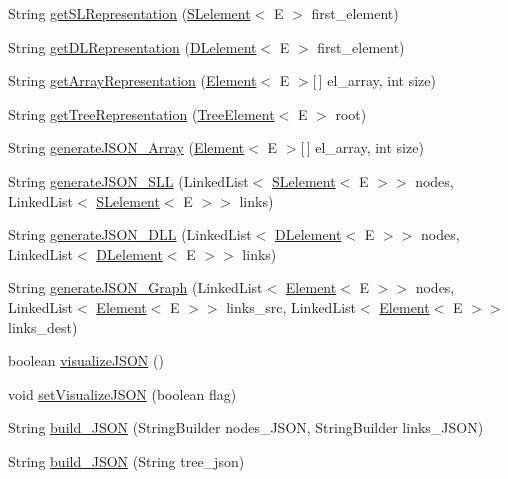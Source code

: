 \begin{DoxyCompactItemize}
String \hyperlink{classbridges_1_1base_1_1_a_d_t_visualizer_a8bfd44ca6eef7b19feb6061cb7e141ef}{get\+S\+L\+Representation} (\hyperlink{classbridges_1_1base_1_1_s_lelement}{S\+Lelement}$<$ E $>$ first\+\_\+element)
\item 
String \hyperlink{classbridges_1_1base_1_1_a_d_t_visualizer_a43eeb9f3321477f58edc3aff52631f3b}{get\+D\+L\+Representation} (\hyperlink{classbridges_1_1base_1_1_d_lelement}{D\+Lelement}$<$ E $>$ first\+\_\+element)
\item 
String \hyperlink{classbridges_1_1base_1_1_a_d_t_visualizer_ad44bb58d6f9c630cc6bbcae175003243}{get\+Array\+Representation} (\hyperlink{classbridges_1_1base_1_1_element}{Element}$<$ E $>$\mbox{[}$\,$\mbox{]} el\+\_\+array, int size)
\item 
String \hyperlink{classbridges_1_1base_1_1_a_d_t_visualizer_ae01d3d38d5c7c3ac239e86d6be46a50a}{get\+Tree\+Representation} (\hyperlink{classbridges_1_1base_1_1_tree_element}{Tree\+Element}$<$ E $>$ root)
\item 
String \hyperlink{classbridges_1_1base_1_1_a_d_t_visualizer_a309d4f0521b66bb1329c0362f1ca5d33}{generate\+J\+S\+O\+N\+\_\+\+Array} (\hyperlink{classbridges_1_1base_1_1_element}{Element}$<$ E $>$\mbox{[}$\,$\mbox{]} el\+\_\+array, int size)
\item 
String \hyperlink{classbridges_1_1base_1_1_a_d_t_visualizer_adf2164b7f4b3befb8b2cb2904efd8c91}{generate\+J\+S\+O\+N\+\_\+\+S\+L\+L} (Linked\+List$<$ \hyperlink{classbridges_1_1base_1_1_s_lelement}{S\+Lelement}$<$ E $>$$>$ nodes, Linked\+List$<$ \hyperlink{classbridges_1_1base_1_1_s_lelement}{S\+Lelement}$<$ E $>$$>$ links)
\item 
String \hyperlink{classbridges_1_1base_1_1_a_d_t_visualizer_a866df531965d152d5686304f07e15a4a}{generate\+J\+S\+O\+N\+\_\+\+D\+L\+L} (Linked\+List$<$ \hyperlink{classbridges_1_1base_1_1_d_lelement}{D\+Lelement}$<$ E $>$$>$ nodes, Linked\+List$<$ \hyperlink{classbridges_1_1base_1_1_d_lelement}{D\+Lelement}$<$ E $>$$>$ links)
\item 
String \hyperlink{classbridges_1_1base_1_1_a_d_t_visualizer_aabf7cbfbed0cd28b365206281176834b}{generate\+J\+S\+O\+N\+\_\+\+Graph} (Linked\+List$<$ \hyperlink{classbridges_1_1base_1_1_element}{Element}$<$ E $>$$>$ nodes, Linked\+List$<$ \hyperlink{classbridges_1_1base_1_1_element}{Element}$<$ E $>$$>$ links\+\_\+src, Linked\+List$<$ \hyperlink{classbridges_1_1base_1_1_element}{Element}$<$ E $>$$>$ links\+\_\+dest)
\item 
boolean \hyperlink{classbridges_1_1base_1_1_a_d_t_visualizer_a1aa47f3633239060197b523cb6b86e06}{visualize\+J\+S\+O\+N} ()
\item 
void \hyperlink{classbridges_1_1base_1_1_a_d_t_visualizer_a784ce15d23e6c8ff0d6e77f2274e2980}{set\+Visualize\+J\+S\+O\+N} (boolean flag)
\item 
String \hyperlink{classbridges_1_1base_1_1_a_d_t_visualizer_a86ec26c0bb98a48a63366ce380ca958f}{build\+\_\+\+J\+S\+O\+N} (String\+Builder nodes\+\_\+\+J\+S\+O\+N, String\+Builder links\+\_\+\+J\+S\+O\+N)
\item 
String \hyperlink{classbridges_1_1base_1_1_a_d_t_visualizer_a520eef21260f327101b7e013f9814c45}{build\+\_\+\+J\+S\+O\+N} (String tree\+\_\+json)
\end{DoxyCompactItemize}
